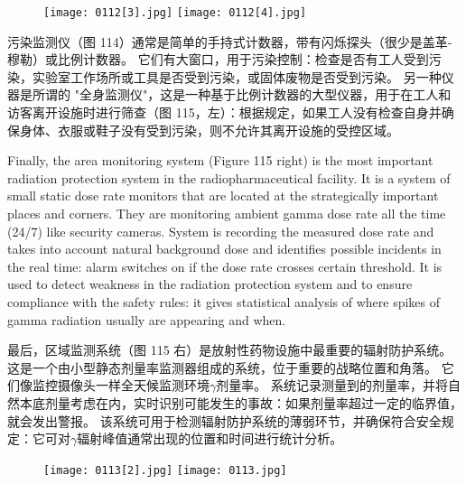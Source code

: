 \documentclass[dvipsnames, svgnames,a4paper,11pt]{article}
\begin{document}
\begin{figure}[htbp]
	\centering
    \texttt{[image: 0112[3].jpg]}    
    \hspace{0.1in}
    \texttt{[image: 0112[4].jpg]} 
     \label{fig114}
\end{figure}

污染监测仪（图 114）通常是简单的手持式计数器，带有闪烁探头（很少是盖革-穆勒）或比例计数器。 它们有大窗口，用于污染控制：检查是否有工人受到污染，实验室工作场所或工具是否受到污染，或固体废物是否受到污染。 另一种仪器是所谓的 "全身监测仪"，这是一种基于比例计数器的大型仪器，用于在工人和访客离开设施时进行筛查（图 115，左）：根据规定，如果工人没有检查自身并确保身体、衣服或鞋子没有受到污染，则不允许其离开设施的受控区域。



Finally, the area monitoring system (Figure 115 right) is the most important radiation
protection system in the radiopharmaceutical facility. It is a system of small static
dose rate monitors that are located at the strategically important places and corners.
They are monitoring ambient gamma dose rate all the time (24/7) like security
cameras. System is recording the measured dose rate and takes into account
natural background dose and identifies possible incidents in the real time: alarm
switches on if the dose rate crosses certain threshold. It is used to detect weakness
in the radiation protection system and to ensure compliance with the safety rules: it
gives statistical analysis of where spikes of gamma radiation usually are appearing
and when.

最后，区域监测系统（图 115 右）是放射性药物设施中最重要的辐射防护系统。 这是一个由小型静态剂量率监测器组成的系统，位于重要的战略位置和角落。 它们像监控摄像头一样全天候监测环境$\gamma$剂量率。 系统记录测量到的剂量率，并将自然本底剂量考虑在内，实时识别可能发生的事故：如果剂量率超过一定的临界值，就会发出警报。 该系统可用于检测辐射防护系统的薄弱环节，并确保符合安全规定：它可对$\gamma$辐射峰值通常出现的位置和时间进行统计分析。

\begin{figure}[htbp]
	\centering
    \texttt{[image: 0113[2].jpg]}    
    \hspace{0.1in}
    \texttt{[image: 0113.jpg]} 
     \label{fig115}
\end{figure}
\end{document}
